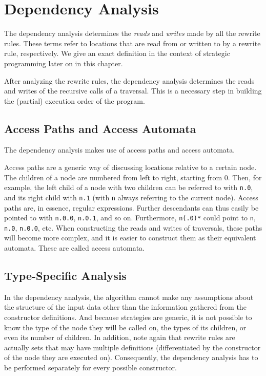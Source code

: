 \section{Dependency Analysis}
The dependency analysis determines the \textit{reads} and \textit{writes} made by all the rewrite rules. These terms refer to locations that are read from or written to by a rewrite rule, respectively. We give an exact definition in the context of strategic programming later on in this chapter.

After analyzing the rewrite rules, the dependency analysis determines the reads and writes of the recursive calls of a traversal. This is a necessary step in building the (partial) execution order of the program.

\subsection{Access Paths and Access Automata}
The dependency analysis makes use of access paths and access automata.

Access paths are a generic way of discussing locations relative to a certain node. The children of a node are numbered from left to right, starting from 0. Then, for example, the left child of a node with two children can be referred to with \texttt{n.0}, and its right child with \texttt{n.1} (with \texttt{n} always referring to the current node). Access paths are, in essence, regular expressions. Further descendants can thus easily be pointed to with \texttt{n.0.0}, \texttt{n.0.1}, and so on. Furthermore, \texttt{n(.0)*} could point to \texttt{n}, \texttt{n.0}, \texttt{n.0.0}, etc. When constructing the reads and writes of traversals, these paths will become more complex, and it is easier to construct them as their equivalent automata. These are called access automata.

\subsection{Type-Specific Analysis}
In the dependency analysis, the algorithm cannot make any assumptions about the structure of the input data other than the information gathered from the constructor definitions. And because strategies are generic, it is not possible to know the type of the node they will be called on, the types of its children, or even its number of children. In addition, note again that rewrite rules are actually sets that may have multiple definitions (differentiated by the constructor of the node they are executed on). Consequently, the dependency analysis has to be performed separately for every possible constructor.

